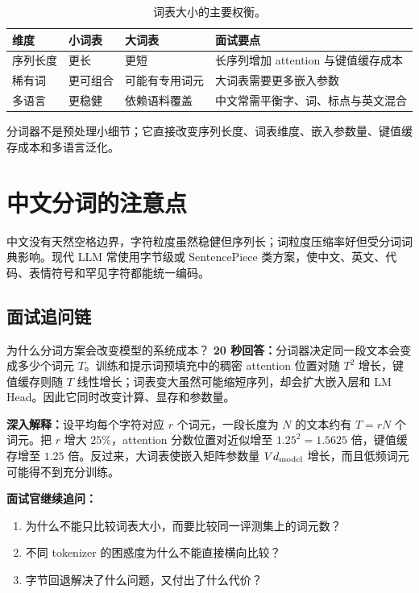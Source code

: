 \begin{table}[htbp]
\centering
\small
\begin{tabularx}{0.86\textwidth}{lYYY}
\toprule
维度 & 小词表 & 大词表 & 面试要点\\
\midrule
序列长度 & 更长 & 更短 & 长序列增加 attention 与键值缓存成本\\
稀有词 & 更可组合 & 可能有专用词元 & 大词表需要更多嵌入参数\\
多语言 & 更稳健 & 依赖语料覆盖 & 中文常需平衡字、词、标点与英文混合\\
\bottomrule
\end{tabularx}
\caption{词表大小的主要权衡。}
\end{table}

\begin{takeawaybox}
分词器不是预处理小细节；它直接改变序列长度、词表维度、嵌入参数量、键值缓存成本和多语言泛化。
\end{takeawaybox}

\section{中文分词的注意点}

中文没有天然空格边界，字符粒度虽然稳健但序列长；词粒度压缩率好但受分词词典影响。现代 LLM 常使用字节级或 SentencePiece 类方案，使中文、英文、代码、表情符号和罕见字符都能统一编码。

\subsection{面试追问链}

\begin{interviewbox}{为什么分词方案会改变模型的系统成本？}
\textbf{20 秒回答：}分词器决定同一段文本会变成多少个词元 $T$。训练和提示词预填充中的稠密 attention 位置对随 $T^2$ 增长，键值缓存则随 $T$ 线性增长；词表变大虽然可能缩短序列，却会扩大嵌入层和 LM Head。因此它同时改变计算、显存和参数量。

\textbf{深入解释：}设平均每个字符对应 $r$ 个词元，一段长度为 $N$ 的文本约有 $T=rN$ 个词元。把 $r$ 增大 $25\%$，attention 分数位置对近似增至 $1.25^2=1.5625$ 倍，键值缓存增至 $1.25$ 倍。反过来，大词表使嵌入矩阵参数量 $Vd_{\rm model}$ 增长，而且低频词元可能得不到充分训练。

\textbf{面试官继续追问：}
\begin{enumerate}
  \item 为什么不能只比较词表大小，而要比较同一评测集上的词元数？
  \item 不同 tokenizer 的困惑度为什么不能直接横向比较？
  \item 字节回退解决了什么问题，又付出了什么代价？
\end{enumerate}
\end{interviewbox}

